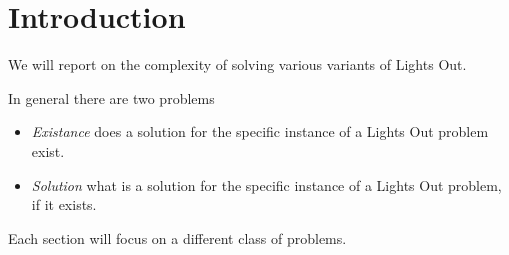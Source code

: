 \section{Introduction}
We will report on the complexity of solving various variants of Lights Out.

In general there are two problems

\begin{itemize}
    \item \emph{Existance} does a solution for the specific instance of a Lights Out problem exist.
    \item \emph{Solution} what is a solution for the specific instance of a Lights Out problem, if it exists. 
\end{itemize}

Each section will focus on a different class of problems.